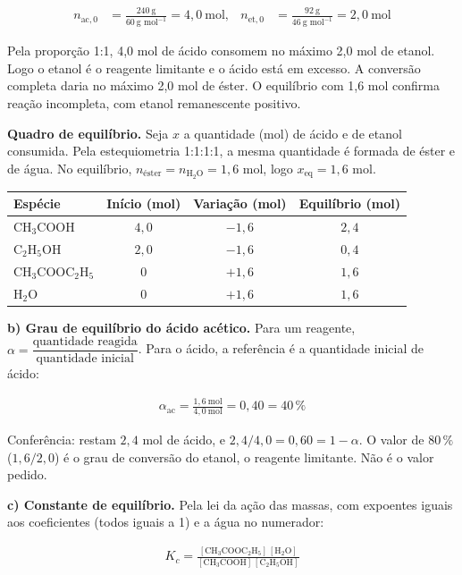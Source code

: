 \documentclass{article}%
\begin{document}
\begin{align*}
n_{\mathrm{ac},0} &= \frac{240\ \text{g}}{60\ \text{g mol}^{-1}} = 4{,}0\ \text{mol}, & n_{\mathrm{et},0} &= \frac{92\ \text{g}}{46\ \text{g mol}^{-1}} = 2{,}0\ \text{mol}
\end{align*}

Pela proporção 1:1, 4,0 mol de ácido consomem no máximo 2,0 mol de etanol. Logo o etanol é o reagente limitante e o ácido está em excesso. A conversão completa daria no máximo 2,0 mol de éster. O equilíbrio com 1,6 mol confirma reação incompleta, com etanol remanescente positivo.

\textbf{Quadro de equilíbrio.} Seja $x$ a quantidade (mol) de ácido e de etanol consumida. Pela estequiometria 1:1:1:1, a mesma quantidade é formada de éster e de água. No equilíbrio, $n_{\text{éster}}=n_{\mathrm{H_2O}}=1{,}6$ mol, logo $x_{\text{eq}}=1{,}6$ mol.

\begin{center}
\begin{tabular}{lccc}
\hline
Espécie & Início (mol) & Variação (mol) & Equilíbrio (mol)\\
\hline
$\mathrm{CH_3COOH}$ & $4{,}0$ & $-1{,}6$ & $2{,}4$\\
$\mathrm{C_2H_5OH}$ & $2{,}0$ & $-1{,}6$ & $0{,}4$\\
$\mathrm{CH_3COOC_2H_5}$ & $0$ & $+1{,}6$ & $1{,}6$\\
$\mathrm{H_2O}$ & $0$ & $+1{,}6$ & $1{,}6$\\
\hline
\end{tabular}
\end{center}

\textbf{b) Grau de equilíbrio do ácido acético.} Para um reagente, $\alpha=\dfrac{\text{quantidade reagida}}{\text{quantidade inicial}}$. Para o ácido, a referência é a quantidade inicial de ácido:

\begin{align*}
\alpha_{\mathrm{ac}} = \frac{1{,}6\ \text{mol}}{4{,}0\ \text{mol}} = 0{,}40 = 40\,\%
\end{align*}

Conferência: restam $2{,}4$ mol de ácido, e $2{,}4/4{,}0 = 0{,}60 = 1-\alpha$. O valor de $80\,\%$ ($1{,}6/2{,}0$) é o grau de conversão do etanol, o reagente limitante. Não é o valor pedido.

\textbf{c) Constante de equilíbrio.} Pela lei da ação das massas, com expoentes iguais aos coeficientes (todos iguais a 1) e a água no numerador:

\begin{align*}
K_c = \frac{[\mathrm{CH_3COOC_2H_5}]\,[\mathrm{H_2O}]}{[\mathrm{CH_3COOH}]\,[\mathrm{C_2H_5OH}]}
\end{align*}
\end{document}
